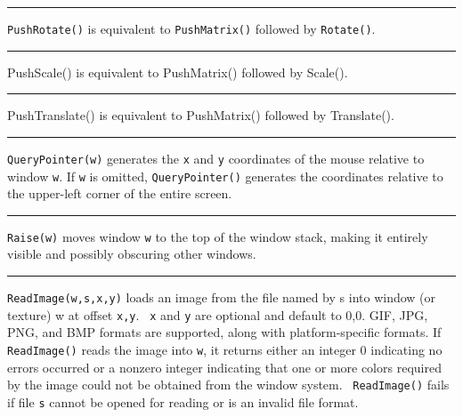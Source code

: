 \bigskip\hrule\vspace{0.1cm}

\noindent
\texttt{PushRotate()} is equivalent to \texttt{PushMatrix()} followed by
\texttt{Rotate()}.

\bigskip\hrule\vspace{0.1cm}

\noindent
{\sffamily
PushScale()\textrm{ is equivalent to }PushMatrix()\textrm{ followed by
}Scale()\textrm{.}}

\bigskip\hrule\vspace{0.1cm}

\noindent
{\sffamily
PushTranslate()\textrm{ is equivalent to }PushMatrix()\textrm{ followed
by }Translate()\textrm{.}}

\bigskip\hrule\vspace{0.1cm}

\noindent
\texttt{QueryPointer(w)} generates the \texttt{x} and \texttt{y}
coordinates of the mouse relative to window \texttt{w}. If \texttt{w}
is omitted, \texttt{QueryPointer()} generates the coordinates relative
to the upper-left corner of the entire screen.

\bigskip\hrule\vspace{0.1cm}

\noindent
\texttt{Raise(w)} moves window \texttt{w} to the top of the window
stack, making it entirely visible and possibly obscuring other windows.

\bigskip\hrule\vspace{0.1cm}

\noindent
\texttt{ReadImage(w,s,x,y)} loads an image from the file named by s into
window (or texture) w at offset \texttt{x,y}. \texttt{\ x} and \texttt{y} are
optional and default to 0,0. GIF, JPG, PNG, and BMP formats are supported,
along with platform-specific formats. If \texttt{ReadImage()} reads the
image into \texttt{w}, it returns either an integer 0 indicating no
errors occurred or a nonzero integer indicating that one or more colors
required by the image could not be obtained from the window system.
\ \texttt{ReadImage()} fails if file \texttt{s} cannot be opened for
reading or is an invalid file format.


